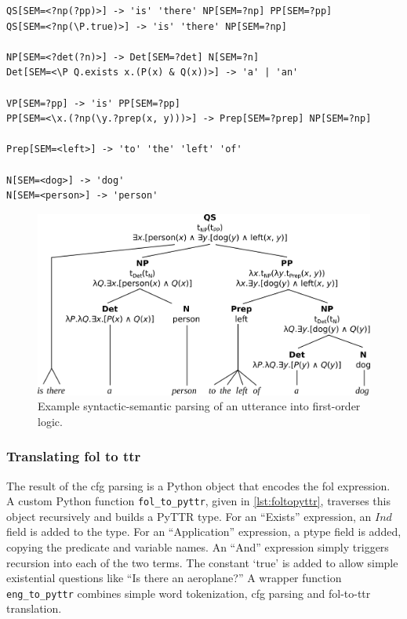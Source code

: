 \begin{lstlisting}[label={lst:grammar}, caption=A snippet of the FCFG grammar]
QS[SEM=<?np(?pp)>] -> 'is' 'there' NP[SEM=?np] PP[SEM=?pp]
QS[SEM=<?np(\P.true)>] -> 'is' 'there' NP[SEM=?np]

NP[SEM=<?det(?n)>] -> Det[SEM=?det] N[SEM=?n]
Det[SEM=<\P Q.exists x.(P(x) & Q(x))>] -> 'a' | 'an'

VP[SEM=?pp] -> 'is' PP[SEM=?pp]
PP[SEM=<\x.(?np(\y.?prep(x, y)))>] -> Prep[SEM=?prep] NP[SEM=?np]

Prep[SEM=<left>] -> 'to' 'the' 'left' 'of'

N[SEM=<dog>] -> 'dog'
N[SEM=<person>] -> 'person'
\end{lstlisting}

\begin{figure}[h]
\includegraphics[width=\textwidth]{tree}
\centering
\caption{Example syntactic-semantic parsing of an utterance into first-order logic.}
\label{fig:tree}
\end{figure}



\subsubsection{Translating \acrlong{fol} to \gls{ttr}}

The result of the \gls{cfg} parsing is a Python object that encodes the \gls{fol} expression.
A custom Python function \texttt{fol\_to\_pyttr}, given in \autoref{lst:foltopyttr}, traverses this object recursively and builds a PyTTR type.
For an ``Exists'' expression, an $Ind$ field is added to the type.
For an ``Application'' expression, a ptype field is added, copying the predicate and variable names.
An ``And'' expression simply triggers recursion into each of the two terms.
The constant `true' is added to allow simple existential questions like ``Is there an aeroplane?''
A wrapper function \texttt{eng\_to\_pyttr} combines simple word tokenization, \gls{cfg} parsing and \gls{fol}-to-\gls{ttr} translation.

